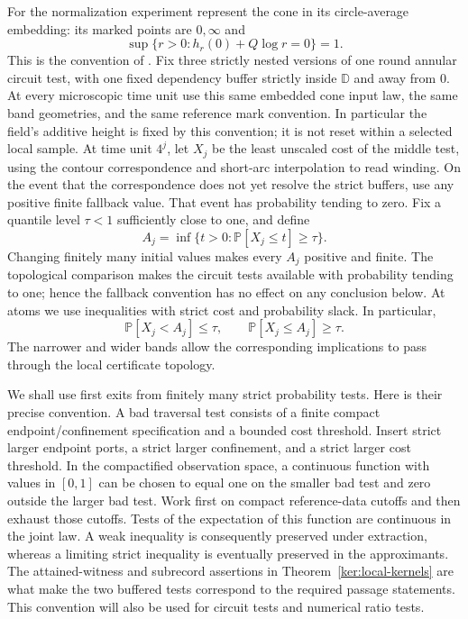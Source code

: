 \documentclass[11pt]{article}
\numberwithin{equation}{section}
\theoremstyle{definition}
\theoremstyle{remark}
\newcommand{\1}{\mathbf 1}
\begin{document}
For the normalization experiment represent the cone in its
circle-average embedding: its marked points are $0,\infty$ and
\[
 \sup\{r>0:h_r(0)+Q\log r=0\}=1.
\]
This is the convention of \cite[Definition~4.10]{DMSMating}.
Fix three strictly nested versions of one round annular circuit test,
with one fixed dependency buffer strictly inside $\mathbb D$ and
away from $0$.  At every microscopic time unit use this same embedded
cone input law, the same band geometries, and the same reference
mark convention.  In particular the field's additive height is fixed
by this convention; it is not reset within a selected local sample.
At time unit $4^j$, let $X_j$ be the least unscaled cost of the
middle test, using the contour correspondence and short-arc
interpolation to read winding.  On the event that the correspondence
does not yet resolve the strict buffers, use any positive finite
fallback value.  That event has probability tending to zero.  Fix a
quantile level $\tau<1$ sufficiently close to one, and define
\begin{equation}
 A_j=\inf\{t>0:\mathbb P[X_j\leq t]\geq\tau\}.
 \label{met:quantile}
\end{equation}
Changing finitely many initial values makes every $A_j$ positive and
finite.  The topological comparison makes the circuit tests available
with probability tending to one; hence the fallback convention has no
effect on any conclusion below.  At atoms we use inequalities with
strict cost and probability slack.  In particular,
\[
 \mathbb P[X_j<A_j]\leq\tau,\qquad
 \mathbb P[X_j\leq A_j]\geq\tau.
\]
The narrower and wider bands allow the corresponding implications to
pass through the local certificate topology.

We shall use first exits from finitely many strict probability tests.
Here is their precise convention.  A bad traversal test consists of a
finite compact endpoint/confinement specification and a bounded cost
threshold.  Insert strict larger endpoint ports, a strict larger
confinement, and a strict larger cost threshold.  In the compactified
observation space, a continuous function with values in $[0,1]$ can be
chosen to equal one on the smaller bad test and zero outside the larger
bad test.  Work first on compact reference-data cutoffs and then
exhaust those cutoffs.  Tests of the expectation of this function are
continuous in the joint law.  A weak inequality is consequently
preserved under extraction, whereas a limiting strict inequality is
eventually preserved in the approximants.  The attained-witness and
subrecord assertions in Theorem~\ref{ker:local-kernels} are what make
the two buffered tests correspond to the required passage statements.
This convention will also be used for circuit tests and numerical
ratio tests.
\end{document}
